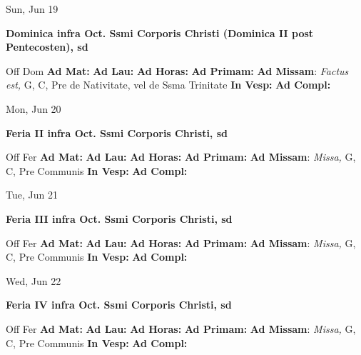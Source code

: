 \documentclass[10pt]{article}
\begin{document}
\begin{minipage}{3.5in}
\vspace{2em}\begin{center}
Sun, Jun 19
\end{center}\textbf{ \large Dominica infra Oct. Ssmi Corporis Christi (Dominica II post Pentecosten), \textnormal{\normalsize sd}}
\begin{justify}
Off Dom
\textbf{Ad Mat: }
\textbf{Ad Lau: }
\textbf{Ad Horas: }
\textbf{Ad Primam: }
\textbf{Ad Missam}: \textit{Factus est,} G, C, Pre de Nativitate, vel de Ssma Trinitate
\textbf{In Vesp: }
\textbf{Ad Compl: }\end{justify}
\end{minipage}



\begin{minipage}{3.5in}
\vspace{2em}\begin{center}
Mon, Jun 20
\end{center}\textbf{ \large Feria II infra Oct. Ssmi Corporis Christi, \textnormal{\normalsize sd}}
\begin{justify}
Off Fer
\textbf{Ad Mat: }
\textbf{Ad Lau: }
\textbf{Ad Horas: }
\textbf{Ad Primam: }
\textbf{Ad Missam}: \textit{Missa,} G, C, Pre Communis
\textbf{In Vesp: }
\textbf{Ad Compl: }\end{justify}
\end{minipage}



\begin{minipage}{3.5in}
\vspace{2em}\begin{center}
Tue, Jun 21
\end{center}\textbf{ \large Feria III infra Oct. Ssmi Corporis Christi, \textnormal{\normalsize sd}}
\begin{justify}
Off Fer
\textbf{Ad Mat: }
\textbf{Ad Lau: }
\textbf{Ad Horas: }
\textbf{Ad Primam: }
\textbf{Ad Missam}: \textit{Missa,} G, C, Pre Communis
\textbf{In Vesp: }
\textbf{Ad Compl: }\end{justify}
\end{minipage}



\begin{minipage}{3.5in}
\vspace{2em}\begin{center}
Wed, Jun 22
\end{center}\textbf{ \large Feria IV infra Oct. Ssmi Corporis Christi, \textnormal{\normalsize sd}}
\begin{justify}
Off Fer
\textbf{Ad Mat: }
\textbf{Ad Lau: }
\textbf{Ad Horas: }
\textbf{Ad Primam: }
\textbf{Ad Missam}: \textit{Missa,} G, C, Pre Communis
\textbf{In Vesp: }
\textbf{Ad Compl: }\end{justify}
\end{minipage}
\end{document}
